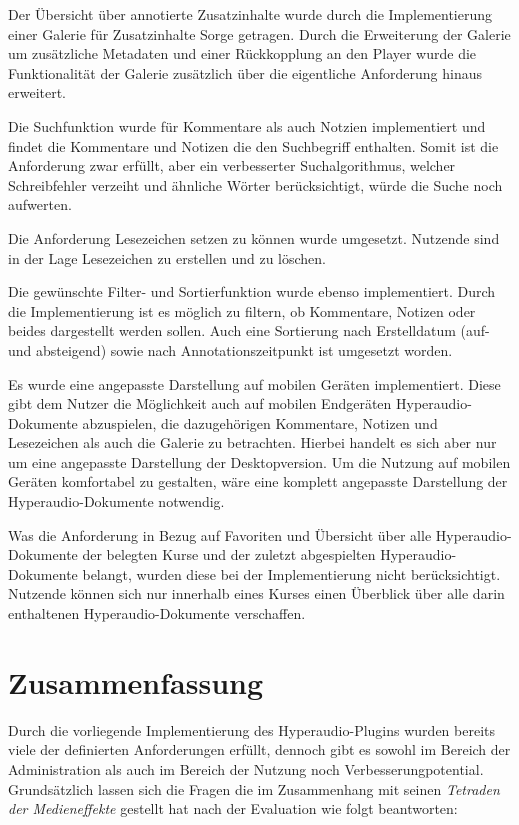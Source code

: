 Der Übersicht über annotierte Zusatzinhalte wurde durch die Implementierung einer Galerie für Zusatzinhalte Sorge getragen. Durch die Erweiterung der Galerie um zusätzliche Metadaten und einer Rückkopplung an den Player wurde die Funktionalität der Galerie zusätzlich über die eigentliche Anforderung hinaus erweitert.

Die Suchfunktion wurde für Kommentare als auch Notzien implementiert und findet die Kommentare und Notizen die den Suchbegriff enthalten. Somit ist die Anforderung zwar erfüllt, aber ein verbesserter Suchalgorithmus, welcher Schreibfehler verzeiht und ähnliche Wörter berücksichtigt, würde die Suche noch aufwerten.

Die Anforderung Lesezeichen setzen zu können wurde umgesetzt. Nutzende sind in der Lage Lesezeichen zu erstellen und zu löschen. 

Die gewünschte Filter- und Sortierfunktion wurde ebenso implementiert. Durch die Implementierung ist es möglich zu filtern, ob Kommentare, Notizen oder beides dargestellt werden sollen. Auch eine Sortierung nach Erstelldatum (auf- und absteigend) sowie nach Annotationszeitpunkt ist umgesetzt worden.

Es wurde eine angepasste Darstellung auf mobilen Geräten implementiert. Diese gibt dem Nutzer die Möglichkeit auch auf mobilen Endgeräten Hyperaudio-Dokumente abzuspielen, die dazugehörigen Kommentare, Notizen und Lesezeichen als auch die Galerie zu betrachten. Hierbei handelt es sich aber nur um eine angepasste Darstellung der Desktopversion. Um die Nutzung auf mobilen Geräten komfortabel zu gestalten, wäre eine komplett angepasste Darstellung der Hyperaudio-Dokumente notwendig.

Was die Anforderung in Bezug auf Favoriten und Übersicht über alle Hyperaudio-Dokumente der belegten Kurse und der zuletzt abgespielten Hyperaudio-Dokumente belangt, wurden diese bei der Implementierung nicht berücksichtigt. Nutzende können sich nur innerhalb eines Kurses einen Überblick über alle darin enthaltenen Hyperaudio-Dokumente verschaffen.




\section{Zusammenfassung}

Durch die vorliegende Implementierung des Hyperaudio-Plugins wurden bereits viele der definierten Anforderungen erfüllt, dennoch gibt es sowohl im Bereich der Administration als auch im Bereich der Nutzung noch Verbesserungpotential. Grundsätzlich lassen sich die Fragen die \cite{mcluhan1977laws} im Zusammenhang mit seinen \textit{Tetraden der Medieneffekte} gestellt hat nach der Evaluation wie folgt beantworten:

